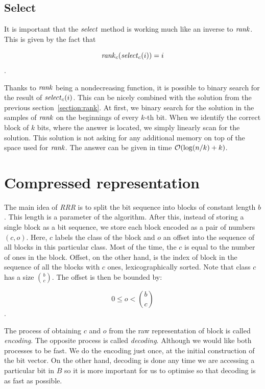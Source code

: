
\subsection{Select}
\label{section:select}

It is important that the $\mathit{select}$ method is working much like an inverse to $\mathit{rank}$. This is given
by the fact that

                $$\mathit{rank}_c(\mathit{select}_c(i)) = i$$.

Thanks to $\mathit{rank}$ being a nondecreasing function, it is possible to binary search for the result
of $\mathit{select}_c(i)$. This can be nicely combined with the solution from the previous
section~\ref{section:rank}. At first, we binary search for the solution in the samples of $\mathit{rank}$
on the beginnings of every $k$-th bit. When we identify the correct block of $k$ bits, where
the answer is located, we simply linearly scan for the solution. This solution is not asking
for any additional memory on top of the space used for $\mathit{rank}$. The answer can be given in time
$\mathcal{O}(\log(n/k)+k)$.


\section{Compressed representation}
\label{section:compressed_bv}

The main idea of \textit{RRR} is to split the bit sequence into blocks of constant length $b$.
This length is a parameter of the algorithm. After this, instead
of storing a single block as a bit sequence, we store each block encoded as a pair
of numbers $(c, o)$. Here, $c$ labels the class of the block and $o$ an offset into
the sequence of all blocks in this particular class. Most of the time, the $c$ is equal
to the number of ones in the block. Offset, on the other hand, is the index of block in
the sequence of all the blocks with $c$ ones, lexicographically sorted. Note that
class $c$ has a size ${b\choose c}$. The offset is then be bounded by:

				$$0 \leq o < {b\choose c}$$.

The process of obtaining $c$ and $o$ from the raw representation of block is called
\textit{encoding}. The opposite process is called \textit{decoding}. Although we would
like both processes to be fast. We do the encoding just once, at the initial construction
of the bit vector. On the other hand, decoding is done any time we are accessing a particular
bit in $B$ so it is more important for us to optimise so that decoding is as fast as possible.

